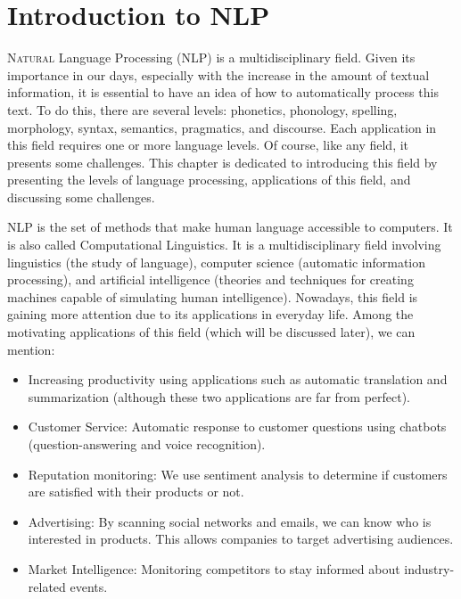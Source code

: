 \documentclass{KBook}
\begin{document}
		\mainmatter
	
\fi
\chapter{Introduction to NLP}

\begin{introduction}
	\lettrine{N}{atural} Language Processing (NLP) is a multidisciplinary field. Given its importance in our days, especially with the increase in the amount of textual information, it is essential to have an idea of how to automatically process this text. To do this, there are several levels: phonetics, phonology, spelling, morphology, syntax, semantics, pragmatics, and discourse. Each application in this field requires one or more language levels. Of course, like any field, it presents some challenges. This chapter is dedicated to introducing this field by presenting the levels of language processing, applications of this field, and discussing some challenges.
\end{introduction}

NLP is the set of methods that make human language accessible to computers. It is also called Computational Linguistics. It is a multidisciplinary field involving linguistics (the study of language), computer science (automatic information processing), and artificial intelligence (theories and techniques for creating machines capable of simulating human intelligence). Nowadays, this field is gaining more attention due to its applications in everyday life. Among the motivating applications of this field (which will be discussed later), we can mention:

\begin{itemize}
	\item Increasing productivity using applications such as automatic translation and summarization (although these two applications are far from perfect).
	\item Customer Service: Automatic response to customer questions using chatbots (question-answering and voice recognition).
	\item Reputation monitoring: We use sentiment analysis to determine if customers are satisfied with their products or not.
	\item Advertising: By scanning social networks and emails, we can know who is interested in products. This allows companies to target advertising audiences.
	\item Market Intelligence: Monitoring competitors to stay informed about industry-related events.
\end{itemize}
\end{document}
